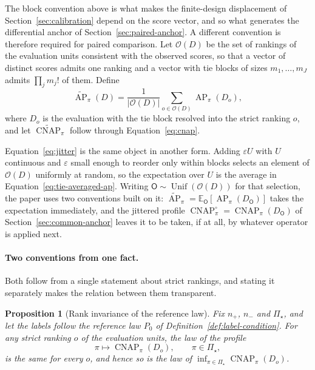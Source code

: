 \documentclass[11pt]{article}
\newcommand{\AP}{\operatorname{AP}}
\newcommand{\CNAP}{\operatorname{CNAP}}
\newcommand{\PSet}{\Pi_\star}
\newcommand{\E}{\mathbb{E}}
\newcommand{\APta}{\widetilde{\AP}}
\newcommand{\CNAPta}{\widetilde{\CNAP}}
\newcommand{\Rank}{\mathsf{O}}
\newcommand{\CNAPj}{\CNAP^{\circ}}
\newcommand{\Unif}{\operatorname{Unif}}
\newtheorem{proposition}{Proposition}
\theoremstyle{remark}
\begin{document}
The block convention above is what makes the finite-design displacement of Section~\ref{sec:calibration} depend on the score vector, and so what generates the differential anchor of Section~\ref{sec:paired-anchor}. A different convention is therefore required for paired comparison. Let $\mathcal{O}(D)$ be the set of rankings of the evaluation units consistent with the observed scores, so that a vector of distinct scores admits one ranking and a vector with tie blocks of sizes $m_1,\ldots,m_J$ admits $\prod_j m_j!$ of them. Define
\begin{equation}
\APta_\pi(D)
=
\frac{1}{|\mathcal{O}(D)|}
\sum_{o\in\mathcal{O}(D)}
\AP_\pi(D_o),
\label{eq:tie-averaged-ap}
\end{equation}
where $D_o$ is the evaluation with the tie block resolved into the strict ranking $o$, and let $\CNAPta_\pi$ follow through Equation~\eqref{eq:cnap}.

Equation~\eqref{eq:jitter} is the same object in another form. Adding $\varepsilon U$ with $U$ continuous and $\varepsilon$ small enough to reorder only within blocks selects an element of $\mathcal{O}(D)$ uniformly at random, so the expectation over $U$ is the average in Equation~\eqref{eq:tie-averaged-ap}. Writing $\Rank\sim\Unif(\mathcal{O}(D))$ for that selection, the paper uses two conventions built on it: $\APta_\pi=\E_{\Rank}[\AP_\pi(D_{\Rank})]$ takes the expectation immediately, and the jittered profile $\CNAPj_\pi=\CNAP_\pi(D_{\Rank})$ of Section~\ref{sec:common-anchor} leaves it to be taken, if at all, by whatever operator is applied next.

\paragraph{Two conventions from one fact.}
Both follow from a single statement about strict rankings, and stating it separately makes the relation between them transparent.

\begin{proposition}[Rank invariance of the reference law]
\label{prop:rank-invariance}
Fix $n_+$, $n_-$ and $\PSet$, and let the labels follow the reference law $P_0$ of Definition~\ref{def:label-condition}. For any strict ranking $o$ of the evaluation units, the law of the profile
\[
\pi\longmapsto\CNAP_\pi(D_o),
\qquad
\pi\in\PSet,
\]
is the same for every $o$, and hence so is the law of $\inf_{\pi\in\PSet}\CNAP_\pi(D_o)$.
\end{proposition}
\end{document}
